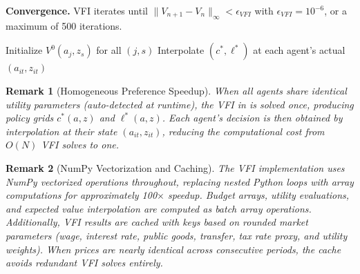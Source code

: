 \documentclass[12pt]{article}
\newtheorem{remark}{Remark}
\begin{document}
\textbf{Convergence.} VFI iterates until $\|V_{n+1} - V_n\|_\infty < \epsilon_{VFI}$ with $\epsilon_{VFI} = 10^{-6}$, or a maximum of 500 iterations.

\begin{algorithm}[t]
\caption{Value Function Iteration}\label{alg:vfi}
Initialize $V^0(a_j, z_s)$ for all $(j, s)$\;
Interpolate $(c^*, \ell^*)$ at each agent's actual $(a_{it}, z_{it})$\;
\end{algorithm}

\begin{remark}[Homogeneous Preference Speedup]
When all agents share identical utility parameters (auto-detected at runtime), the VFI in  is solved once, producing policy grids $c^*(a, z)$ and $\ell^*(a, z)$. Each agent's decision is then obtained by interpolation at their state $(a_{it}, z_{it})$, reducing the computational cost from $O(N)$ VFI solves to one.
\end{remark}

\begin{remark}[NumPy Vectorization and Caching]
The VFI implementation uses NumPy vectorized operations throughout, replacing nested Python loops with array computations for approximately 100$\times$ speedup. Budget arrays, utility evaluations, and expected value interpolation are computed as batch array operations. Additionally, VFI results are cached with keys based on rounded market parameters (wage, interest rate, public goods, transfer, tax rate proxy, and utility weights). When prices are nearly identical across consecutive periods, the cache avoids redundant VFI solves entirely.
\end{remark}
\end{document}
